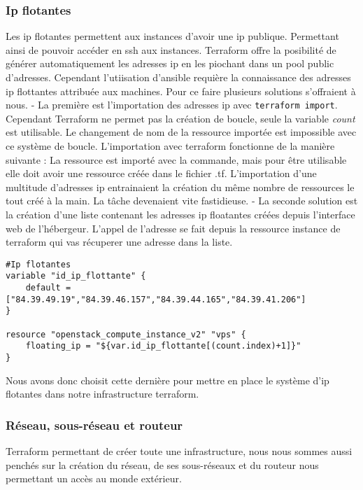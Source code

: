 \documentclass[]{article}
\begin{document}
\subsubsection{Ip flotantes}\label{ip-flotantes}

Les ip flotantes permettent aux instances d'avoir une ip publique.
Permettant ainsi de pouvoir accéder en ssh aux instances. Terraform
offre la posibilité de générer automatiquement les adresses ip en les
piochant dans un pool public d'adresses. Cependant l'utiisation
d'ansible requière la connaissance des adresses ip flottantes attribuée
aux machines. Pour ce faire plusieurs solutions s'offraient à nous. - La
première est l'importation des adresses ip avec
\texttt{terraform\ import}. Cependant Terraform ne permet pas la
création de boucle, seule la variable \emph{count} est utilisable. Le
changement de nom de la ressource importée est impossible avec ce
système de boucle. L'importation avec terraform fonctionne de la manière
suivante : La ressource est importé avec la commande, mais pour être
utilisable elle doit avoir une ressource créée dans le fichier .tf.
L'importation d'une multitude d'adresses ip entrainaient la création du
même nombre de ressources le tout créé à la main. La tâche devenaient
vite fastidieuse. - La seconde solution est la création d'une liste
contenant les adresses ip floatantes créées depuis l'interface web de
l'hébergeur. L'appel de l'adresse se fait depuis la ressource instance
de terraform qui vas récuperer une adresse dans la liste.

\begin{verbatim}
#Ip flotantes
variable "id_ip_flottante" {
    default = ["84.39.49.19","84.39.46.157","84.39.44.165","84.39.41.206"]
}

resource "openstack_compute_instance_v2" "vps" {
    floating_ip = "${var.id_ip_flottante[(count.index)+1]}"
}
\end{verbatim}

Nous avons donc choisit cette dernière pour mettre en place le système
d'ip flotantes dans notre infrastructure terraform.

\subsubsection{Réseau, sous-réseau et
routeur}\label{ruxe9seau-sous-ruxe9seau-et-routeur}

Terraform permettant de créer toute une infrastructure, nous nous sommes
aussi penchés sur la création du réseau, de ses sous-réseaux et du
routeur nous permettant un accès au monde extérieur.
\end{document}
